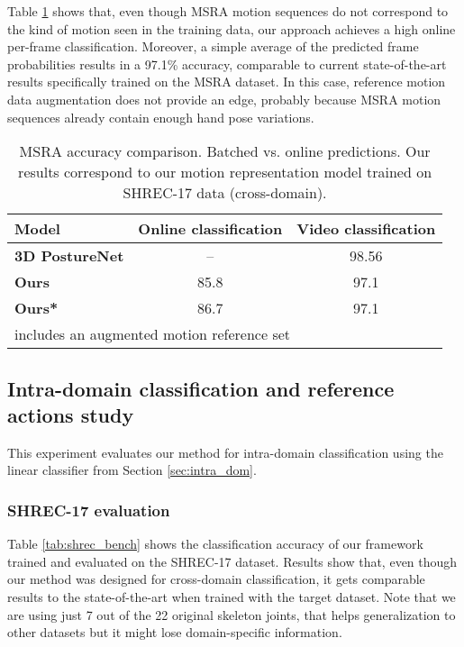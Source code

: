 \documentclass[letterpaper, 10 pt, conference]{ieeeconf}
\begin{document}
Table \ref{tab:msra_bench} shows that, even though MSRA motion sequences do not correspond to the kind of motion seen in the training data, our approach achieves a high online per-frame classification.
Moreover, a simple average of the predicted frame probabilities results in a 97.1\% accuracy, comparable to current state-of-the-art results specifically trained on the MSRA dataset.
In this case, reference motion data augmentation does not provide an edge, probably because MSRA motion sequences already contain enough hand pose variations.

\begin{table}[!tb]
    \centering
\begin{tabular}{|l|c|c|}
\hline
\textbf{Model} & \textbf{Online classification} & \multicolumn{1}{l|}{\textbf{Video classification}} \\ \hline
\textbf{3D PostureNet \cite{liu20203d}} & -- & 98.56 \\ \hline
\textbf{Ours} & 85.8 & 97.1 \\ \hline
\textbf{Ours*} & 86.7 & 97.1 \\ \hline
\multicolumn{3}{l}{\footnotesize  includes an augmented motion reference set} \\
\end{tabular}
    \caption{MSRA accuracy comparison. Batched vs. online predictions. Our results correspond to our motion representation model trained on SHREC-17 data (cross-domain).}
    \label{tab:msra_bench}
\end{table}


\subsection{Intra-domain classification and reference actions study}
\label{sec:intra-dom-res}
This experiment evaluates our method for intra-domain classification using the linear classifier from Section \ref{sec:intra_dom}. 

\subsubsection{SHREC-17 evaluation}

Table \ref{tab:shrec_bench} shows the classification accuracy of our framework trained and evaluated on the SHREC-17 dataset.
Results show that, even though our method was designed for cross-domain classification, it gets comparable results to the state-of-the-art when trained with the target dataset. Note that we are using just 7 out of the 22 original skeleton joints, that helps generalization to other datasets but it might lose domain-specific information.
\end{document}
